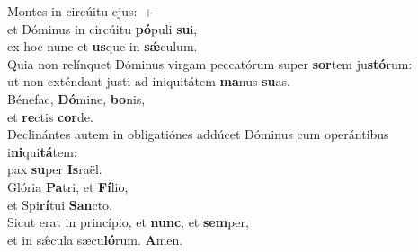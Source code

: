 \evenverse Montes in circúitu ejus:~+\\\evenverse  et Dóminus in circúitu \textbf{pó}puli \textbf{su}i,~\*\\
\evenverse ex hoc nunc et \textbf{us}que in \textbf{sǽ}culum.\\
\oddverse Quia non relínquet Dóminus virgam peccatórum super \textbf{sor}tem ju\textbf{stó}rum:~\*\\
\oddverse ut non exténdant justi ad iniquitátem \textbf{ma}nus \textbf{su}as.\\
\evenverse Bénefac, \textbf{Dó}mine, \textbf{bo}nis,~\*\\
\evenverse et \textbf{re}ctis \textbf{cor}de.\\
\oddverse Declinántes autem in obligatiónes addúcet Dóminus cum operántibus i\textbf{ni}qui\textbf{tá}tem:~\*\\
\oddverse pax \textbf{su}per \textbf{Is}raël.\\
\evenverse Glória \textbf{Pa}tri, et \textbf{Fí}lio,~\*\\
\evenverse et Spi\textbf{rí}tui \textbf{San}cto.\\
\oddverse Sicut erat in princípio, et \textbf{nunc}, et \textbf{sem}per,~\*\\
\oddverse et in sǽcula sæcu\textbf{ló}rum. \textbf{A}men.\\
